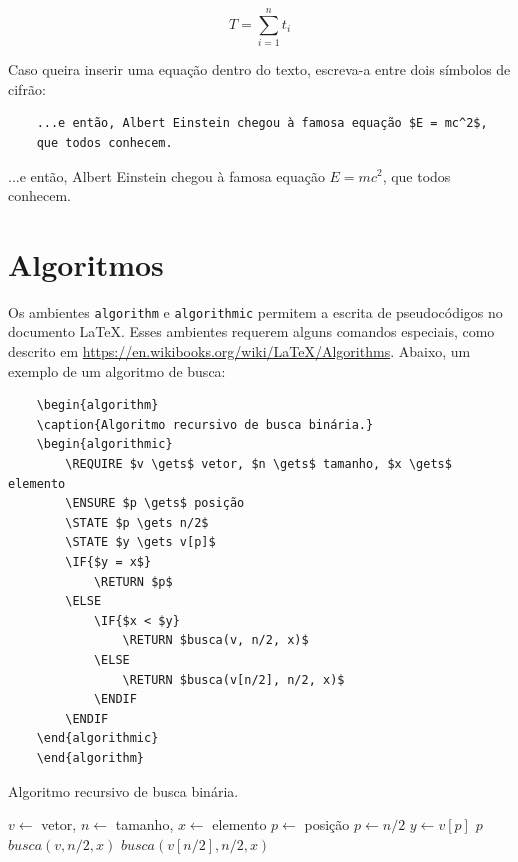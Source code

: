 \begin{equation}
    \label{eq:somatorio}
    T = \sum_{i=1}^{n} t_i
\end{equation}

Caso queira inserir uma equação dentro do texto, escreva-a entre dois símbolos de cifrão:

\begin{verbatim}
    ...e então, Albert Einstein chegou à famosa equação $E = mc^2$,
    que todos conhecem.
\end{verbatim}

...e então, Albert Einstein chegou à famosa equação $E = mc^2$, que todos conhecem.

\section{Algoritmos}
\label{sec:algoritmos}

Os ambientes \verb=algorithm= e \verb=algorithmic= permitem a escrita de pseudocódigos no documento \LaTeX. Esses ambientes requerem alguns comandos especiais, como descrito em \url{https://en.wikibooks.org/wiki/LaTeX/Algorithms}. Abaixo, um exemplo de um algoritmo de busca:

\begin{verbatim}
    \begin{algorithm}
    \caption{Algoritmo recursivo de busca binária.}
    \begin{algorithmic}
        \REQUIRE $v \gets$ vetor, $n \gets$ tamanho, $x \gets$ elemento
        \ENSURE $p \gets$ posição
        \STATE $p \gets n/2$
        \STATE $y \gets v[p]$
        \IF{$y = x$}
            \RETURN $p$
        \ELSE
            \IF{$x < $y}
                \RETURN $busca(v, n/2, x)$
            \ELSE
                \RETURN $busca(v[n/2], n/2, x)$
            \ENDIF
        \ENDIF
    \end{algorithmic}
    \end{algorithm}
\end{verbatim}

\begin{algorithm}
\caption{Algoritmo recursivo de busca binária.}
\begin{algorithmic}
    \REQUIRE $v \gets$ vetor, $n \gets$ tamanho, $x \gets$ elemento
    \ENSURE $p \gets$ posição
    \STATE $p \gets n/2$
    \STATE $y \gets v[p]$
        \RETURN $p$
    \ELSE
            \RETURN $busca(v, n/2, x)$
        \ELSE
            \RETURN $busca(v[n/2], n/2, x)$
        \ENDIF
    \ENDIF
\end{algorithmic}
\end{algorithm}

